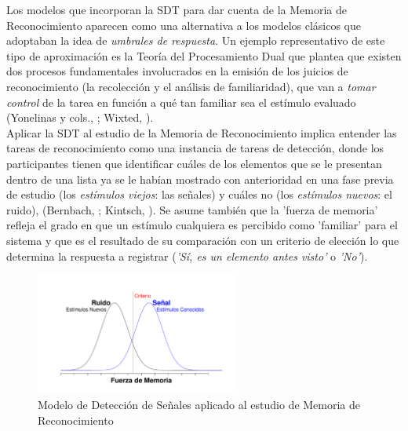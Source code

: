Los modelos que incorporan la SDT para dar cuenta de la Memoria de Reconocimiento aparecen como una alternativa a los modelos clásicos que adoptaban la idea de \textit{umbrales de respuesta}. Un ejemplo representativo de este tipo de aproximación es la Teoría del Procesamiento Dual que plantea que existen dos procesos fundamentales involucrados en la emisión de los juicios de reconocimiento (la recolección y el análisis de familiaridad), que van a \textit{tomar control} de la tarea en función a qué tan familiar sea el estímulo evaluado (Yonelinas y cols., \citeyear{Yonelinas1996}; Wixted, \citeyear{Wixted2007}).\\

Aplicar la SDT al estudio de la Memoria de Reconocimiento implica entender las tareas de reconocimiento como una instancia de tareas de detección, donde los participantes tienen que identificar cuáles de los elementos que se le presentan dentro de una lista ya se le habían mostrado con anterioridad en una fase previa de estudio (los \textit{estímulos viejos}: las señales) y cuáles no (los \textit{estímulos nuevos}: el ruido), (Bernbach, \citeyear{Bernbach1967}; Kintsch, \citeyear{Kintsch1967}). Se asume también que la 'fuerza de memoria' refleja el grado en que un estímulo cualquiera es percibido como 'familiar' para el sistema y que es el resultado de su comparación con un criterio de elección lo que determina la respuesta a registrar (\textit{'Sí, es un elemento antes visto'} o \textit{'No'}).\\ 

\begin{figure}[th]
\centering
\includegraphics[width=0.60\textwidth]{Figures/RM_SDT_1} 
\caption[SDT en Memoria de Reconocimiento]{Modelo de Detección de Señales aplicado al estudio de Memoria de Reconocimiento}
\label{fig:RM_SDT_1}
\end{figure}

